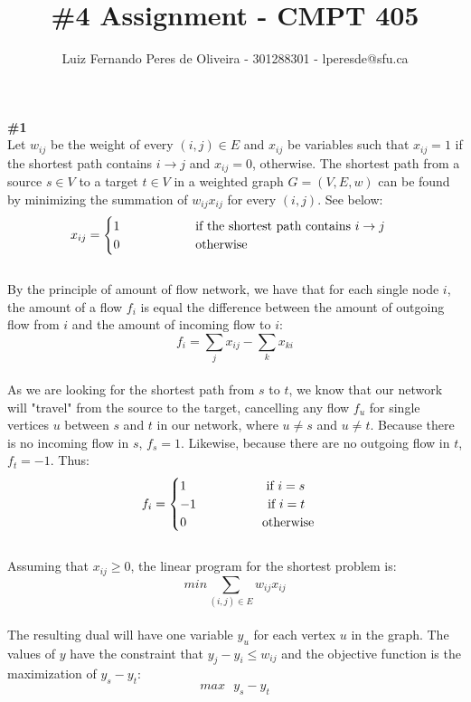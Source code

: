 \documentclass{article}
\title{\#4 Assignment - CMPT 405}
\author{Luiz Fernando Peres de Oliveira - 301288301 - lperesde@sfu.ca}
\newcommand\tab[1][1cm]{\hspace*{#1}}
\begin{document}
\maketitle
\textbf{\#1}
\\
Let $w_{ij}$ be the weight of every $(i, j) \in E$ and $x_{ij}$ be variables such that $x_{ij} = 1$ if the shortest path contains $i \rightarrow j$ and $x_{ij} = 0$, otherwise. The shortest path from a source $s \in V$ to a target $t \in V$ in a weighted graph $G=(V, E, \textit{w})$ can be found by minimizing the summation of $w_{ij}x_{ij}$ for every $(i, j)$. See below:
\begin{gather*}
x_{ij} =
\begin{cases}
1 \tab\tab\text{ if the shortest path contains } i \rightarrow j \\
0 \tab\tab\text{ otherwise}\\
\end{cases}
\end{gather*}
\\
By the principle of amount of flow network, we have that for each single node $i$, the amount of a flow $f_i$ is equal the difference between the amount of outgoing flow from $i$ and the amount of incoming flow to $i$:
$$
f_i = \sum_{j}x_{ij} - \sum_{k} x_{ki}
$$
\\
As we are looking for the shortest path from $s$ to $t$, we know that our network will "travel" from the source to the target, cancelling any flow $f_u$ for single vertices $u$ between $s$ and $t$ in our network, where $u \neq s$ and $u \neq t$. Because there is no incoming flow in $s$, $f_s = 1$. Likewise, because there are no outgoing flow in $t$, $f_t = -1$. Thus:
\begin{gather*}
f_i =
\begin{cases}
1 \text{ } \tab\tab\text{ if } i = s\\
-1 \tab\tab\text{if } i = t\\
0 \tab\tab\text{ otherwise}
\end{cases}
\end{gather*}
\\
Assuming that $x_{ij} \geq 0$, the linear program for the shortest problem is:
$$
min \sum_{(i, j) \in E} w_{ij}x_{ij}
$$
\\
The resulting dual will have one variable $y_u$ for each vertex $u$ in the  graph. The values of $y$ have the constraint that $y_j - y_i \leq w_{ij}$ and the objective function is the maximization of $y_s - y_t$:
\\
$$
max \text{ } y_s - y_t
$$
\end{document}
